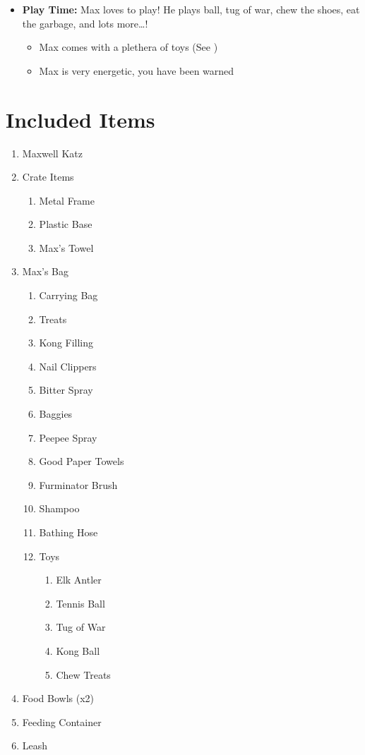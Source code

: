 \documentclass[pdftex,12pt]{article}
\begin{document}
\begin{itemize}
\begin{itemize}
        \end{itemize}
    \item \textbf{Play Time:} Max loves to play! He plays ball, tug of war, chew
        the shoes, eat the garbage, and lots more\ldots!
        \begin{itemize}
            \item Max comes with a plethera of toys
                  (See )
            \item Max is very energetic, you have been warned
        \end{itemize}
\end{itemize}

\newpage
\section{Included Items}

\begin{enumerate}\label{itm:included_items}
    \item Maxwell Katz
    \item Crate Items
        \begin{enumerate}
            \item Metal Frame
            \item Plastic Base
            \item Max's Towel
        \end{enumerate}
    \item Max's Bag
        \begin{enumerate}
            \item Carrying Bag
            \item Treats
            \item Kong Filling
            \item Nail Clippers
            \item Bitter Spray
            \item Baggies
            \item Peepee Spray
            \item Good Paper Towels
            \item Furminator Brush
            \item Shampoo
            \item Bathing Hose
            \item Toys
                \begin{enumerate}
                    \item Elk Antler
                    \item Tennis Ball
                    \item Tug of War
                    \item Kong Ball
                    \item Chew Treats
                \end{enumerate}
        \end{enumerate}
    \item Food Bowls (x2)
    \item Feeding Container
    \item Leash
\end{enumerate}
\end{document}
